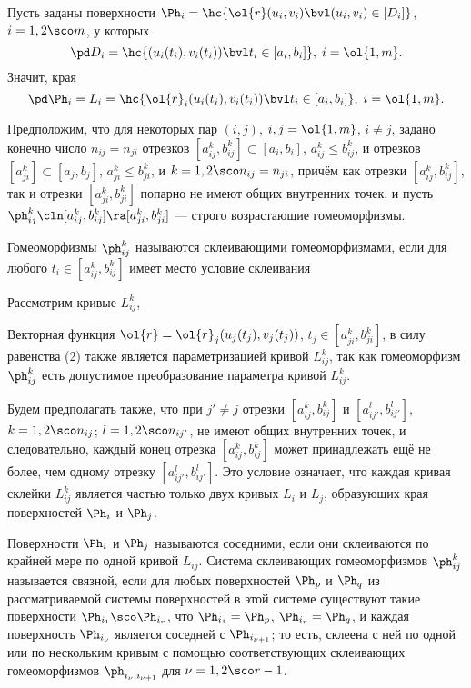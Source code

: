 \documentclass[a4paper]{article}
\begin{document}
Пусть заданы поверхности $\Ph_i=\hc{\ol{r}(u_i,v_i) \bvl
(u_i,v_i)\in[D_i]}$, $i=1,2\sco m$, у которых $$\pd D_i =
\hc{(u_i(t_i),v_i(t_i))\bvl t_i\in[a_i,b_i]},\;i=\ol{1,m}.$$ Значит,
края $$\pd \Ph_i=L_i=\hc{\ol{r}_i(u_i(t_i),v_i(t_i))\bvl
t_i\in[a_i,b_i]}, \;i=\ol{1,m}.$$

Предположим, что для некоторых пар $(i,j)$, $i,j=\ol{1,m}$, $i\ne
j$, задано конечно число $n_{ij}=n_{ji}$ отрезков
$[a_{ij}^k,b^k_{ij}]\subset[a_i,b_i]$, $a^k_{ij}\le b^k_{ij}$, и
отрезков $[a^k_{ji}]\subset[a_j,b_j]$, $a^k_{ji}\le b^k_{ji}$, и
$k=1,2\sco n_{ij}=n_{ji}$, причём как отрезки $[a^k_{ij},b^k_{ij}]$,
так и отрезки $[a^k_{ji},b^k_{ji}]$ попарно не имеют общих
внутренних точек, и пусть $\ph^k_{ij}\cln
[a^k_{ij},b^k_{ij}]\ra[a^k_{ji},b^k_{ji}]$ --- строго возрастающие
гомеоморфизмы.

Гомеоморфизмы $\ph^k_{ij}$ называются склеивающими гомеоморфизмами,
если для любого $t_i\in[a^k_{ij},b^k_{ij}]$ имеет место условие
склеивания 

Рассмотрим кривые $L^k_{ij}$, 

Векторная функция $\ol{r}=\ol{r}_j(u_j(t_j),v_j(t_j))$,
$t_j\in[a_{ji}^k,b_{ji}^k]$, в силу равенства (2) также является
параметризацией кривой $L^k_{ij}$, так как гомеоморфизм $\ph^k_{ij}$
есть допустимое преобразование параметра кривой $L^k_{ij}$.

Будем предполагать также, что при $j'\ne j$ отрезки
$[a^k_{ij},b^k_{ij}]$ и $[a^l_{ij'},b^l_{ij'}]$, $k=1,2\sco n_{ij}$;
$l=1,2\sco n_{ij'}$, не имеют общих внутренних точек, и
следовательно, каждый конец отрезка $[a^k_{ij},b^k_{ij}]$ может
принадлежать ещё не более, чем одному отрезку
$[a^l_{ij'},b^l_{ij'}]$. Это условие означает, что каждая кривая
склейки $L^k_{ij}$ является частью только двух кривых $L_i$ и $L_j$,
образующих края поверхностей $\Ph_i$ и $\Ph_j$.

Поверхности $\Ph_i$ и $\Ph_j$ называются соседними, если они
склеиваются по крайней мере по одной кривой $L_{ij}$. Система
склеивающих гомеоморфизмов $\ph^k_{ij}$ называется связной, если для
любых поверхностей $\Ph_p$ и $\Ph_q$ из рассматриваемой системы
поверхностей в этой системе существуют такие поверхности
$\Ph_{i_1}\sco\Ph_{i_r}$, что $\Ph_{i_1}=\Ph_p$, $\Ph_{i_r} =
\Ph_q$, и каждая поверхность $\Ph_{i_\nu}$ является соседней с
$\Ph_{i_{\nu+1}}$; то есть, склеена с ней по одной или по нескольким
кривым с помощью соответствующих склеивающих гомеоморфизмов
$\ph_{i_{\nu},i_{\nu+1}}$ для $\nu=1,2\sco r-1$.
\end{document}
